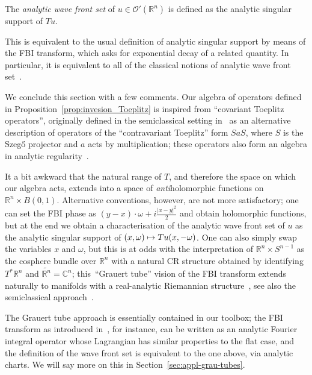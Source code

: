\documentclass[AHL,Unicode,longabstracts,published]{cedram}
\newcommand{\clO}{\mathcal{O}}
\newcommand\1{\mathds{1}}
\newcommand{\R}{\mathbb{R}}
\newcommand{\C}{\mathbb{C}}
\let\oldmapsto\mapsto
\renewcommand*{\mapsto}{\mathchoice{\longmapsto}{\oldmapsto}{\oldmapsto}{\oldmapsto}}
\begin{document}
\begin{defi}\label{def:WFa}
The \emph{analytic wave front set} of $u\in \clO'(\R^n)$ is defined as the analytic singular support of $Tu$.
\end{defi}

This is equivalent to the usual definition of analytic singular support by means of the FBI transform, which asks for exponential decay of a related quantity. In particular, it is equivalent to all of the classical notions of analytic wave front set~\cite{bony_equivalence_1977}.

We conclude this section with a few comments. Our algebra of operators defined in Proposition~\ref{prop:invesion_Toeplitz} is inspired from ``covariant Toeplitz operators'', originally defined in the semiclassical setting in~\cite{charles_berezin-toeplitz_2003} as an alternative description of operators of the ``contravariant Toeplitz'' form $SaS$, where $S$ is the Szeg\H{o} projector and $a$ acts by multiplication; these operators also form an algebra in analytic regularity~\cite{deleporte_toeplitz_2018,rouby_analytic_2018}.

It a bit awkward that the natural range of $T$, and therefore the space on which our algebra acts, extends into a space of \emph{anti}holomorphic functions on $\R^n\times B(0,1)$. Alternative conventions, however, are not more satisfactory; one can set the FBI phase as $(y-x)\cdot
\omega+i\frac{|x-y|^2}{2}$ and obtain holomorphic functions, but at the end we obtain a characterisation of the analytic wave front set of $u$ as the analytic singular support of $(x,\omega)\mapsto Tu(x,-\omega)$. One can also simply swap the variables $x$ and $\omega$, but this is at odds with the interpretation of $\R^n\times S^{n-1}$ as the cosphere bundle over $\R^n$ with a natural CR structure obtained by identifying $T^*\R^n$ and $\widetilde{\R^n}=\C^n$; this~``Grauert tube'' vision of the FBI transform extends naturally to manifolds with a real-analytic Riemannian structure~\cite{guillemin_grauert_1991,guillemin_grauert_1992,leichtnam_intrinsic_1996}, see also the semiclassical approach~\cite{sjostrand_density_1996}.

The Grauert tube approach is essentially contained in our toolbox; the FBI transform as introduced in~\cite{leichtnam_intrinsic_1996}, for instance, can be written as an analytic Fourier integral operator whose Lagrangian has similar properties to the flat case, and the definition of the wave front set is equivalent to the one above, via analytic charts. We will say more on this in Section~\ref{sec:appl-grau-tubes}.
\end{document}
